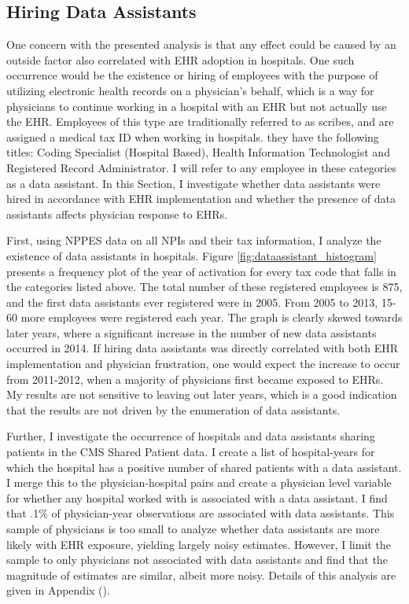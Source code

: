 \documentclass[11pt]{article}
\begin{document}
\subsection{Hiring Data Assistants}\label{sec:dataass}

One concern with the presented analysis is that any effect could be caused by an outside factor also correlated with EHR adoption in hospitals. One such occurrence would be the existence or hiring of employees with the purpose of utilizing electronic health records on a physician's behalf, which is a way for physicians to continue working in a hospital with an EHR but not actually use the EHR. Employees of this type are traditionally referred to as scribes, and are assigned a medical tax ID when working in hospitals. they have the following titles: Coding Specialist (Hospital Based), Health Information Technologist and Registered Record Administrator. I will refer to any employee in these categories as a data assistant. In this Section, I investigate whether data assistants were hired in accordance with EHR implementation and whether the presence of data assistants affects physician response to EHRs.  

First, using NPPES data on all NPIs and their tax information, I analyze the existence of data assistants in hospitals. Figure \ref{fig:dataassistant_histogram} presents a frequency plot of the year of activation for every tax code that falls in the categories listed above. The total number of these registered employees is 875, and the first data assistants ever registered were in 2005. From 2005 to 2013, 15-60 more employees were registered each year. The graph is clearly skewed towards later years, where a significant increase in the number of new data assistants occurred in 2014. If hiring data assistants was directly correlated with both EHR implementation and physician frustration, one would expect the increase to occur from 2011-2012, when a majority of physicians first became exposed to EHRs. My results are not sensitive to leaving out later years, which is a good indication that the results are not driven by the enumeration of data assistants. 

Further, I investigate the occurrence of hospitals and data assistants sharing patients in the CMS Shared Patient data. I create a list of hospital-years for which the hospital has a positive number of shared patients with a data assistant. I merge this to the physician-hospital pairs and create a physician level variable for whether any hospital worked with is associated with a data assistant. I find that .1\% of physician-year observations are associated with data assistants. This sample of physicians is too small to analyze whether data assistants are more likely with EHR exposure, yielding largely noisy estimates. However, I limit the sample to only physicians not associated with data assistants and find that the magnitude of estimates are similar, albeit more noisy. Details of this analysis are given in Appendix (). 
\end{document}
